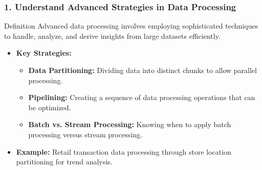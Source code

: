 \documentclass[aspectratio=169]{beamer}
\begin{document}
\begin{frame}[fragile]
    \frametitle{1. Understand Advanced Strategies in Data Processing}
    
    \begin{block}{Definition}
        Advanced data processing involves employing sophisticated techniques to handle, analyze, and derive insights from large datasets efficiently.
    \end{block}
    
    \begin{itemize}
        \item \textbf{Key Strategies:}
        \begin{itemize}
            \item \textbf{Data Partitioning:} Dividing data into distinct chunks to allow parallel processing.
            \item \textbf{Pipelining:} Creating a sequence of data processing operations that can be optimized.
            \item \textbf{Batch vs. Stream Processing:} Knowing when to apply batch processing versus stream processing.
        \end{itemize}
        \item \textbf{Example:} Retail transaction data processing through store location partitioning for trend analysis.
    \end{itemize}
\end{frame}
\end{document}
